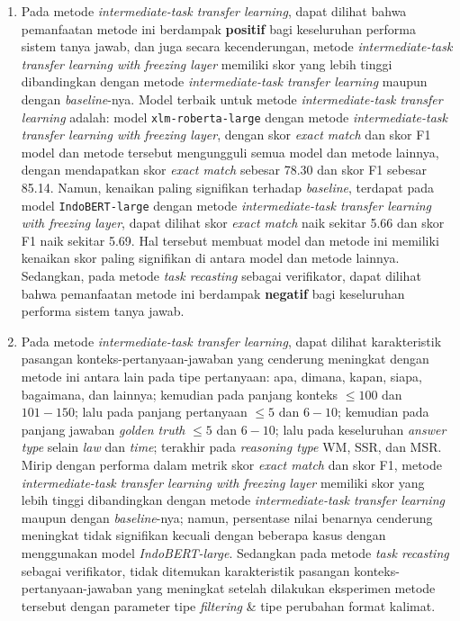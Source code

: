 \begin{enumerate}
	
 \item {}
	
 Pada metode \emph{intermediate-task transfer learning}, dapat dilihat bahwa pemanfaatan metode ini berdampak \textbf{positif} bagi keseluruhan performa sistem tanya jawab, dan juga secara kecenderungan, metode \emph{intermediate-task transfer learning with freezing layer} memiliki skor yang lebih tinggi dibandingkan dengan metode \emph{intermediate-task transfer learning} maupun dengan \emph{baseline}-nya. Model terbaik untuk metode \emph{intermediate-task transfer learning} adalah: model \texttt{xlm-roberta-large} dengan metode \emph{intermediate-task transfer learning with freezing layer}, dengan skor \emph{exact match} dan skor F1 model dan metode tersebut mengungguli semua model dan metode lainnya, dengan mendapatkan skor \emph{exact match} sebesar 78.30 dan skor F1 sebesar 85.14. Namun, kenaikan paling signifikan terhadap \emph{baseline}, terdapat pada model \texttt{IndoBERT-large} dengan metode \emph{intermediate-task transfer learning with freezing layer}, dapat dilihat skor \emph{exact match} naik sekitar 5.66 dan skor F1 naik sekitar 5.69. Hal tersebut membuat model dan metode ini memiliki kenaikan skor paling signifikan di antara model dan metode lainnya. Sedangkan, pada metode \emph{task recasting} sebagai verifikator, dapat dilihat bahwa pemanfaatan metode ini berdampak \textbf{negatif} bagi keseluruhan performa sistem tanya jawab.

 \item {}

 Pada metode \emph{intermediate-task transfer learning}, dapat dilihat karakteristik pasangan konteks-pertanyaan-jawaban yang cenderung meningkat dengan metode ini antara lain pada tipe pertanyaan: apa, dimana, kapan, siapa, bagaimana, dan lainnya; kemudian pada panjang konteks $\leq100$ dan $101-150$; lalu pada panjang pertanyaan $\leq5$ dan $6-10$; kemudian pada panjang jawaban \emph{golden truth} $\leq5$ dan $6-10$; lalu pada keseluruhan \emph{answer type} selain \emph{law} dan \emph{time}; terakhir pada \emph{reasoning type} WM, SSR, dan MSR. Mirip dengan performa dalam metrik skor \emph{exact match} dan skor F1, metode \emph{intermediate-task transfer learning with freezing layer} memiliki skor yang lebih tinggi dibandingkan dengan metode \emph{intermediate-task transfer learning} maupun dengan \emph{baseline}-nya; namun, persentase nilai benarnya cenderung meningkat tidak signifikan kecuali dengan beberapa kasus dengan menggunakan model \emph{IndoBERT-large}. Sedangkan pada metode \emph{task recasting} sebagai verifikator, tidak ditemukan karakteristik pasangan konteks-pertanyaan-jawaban yang meningkat setelah dilakukan eksperimen metode tersebut dengan parameter tipe \emph{filtering} \& tipe perubahan format kalimat.

\end{enumerate}


